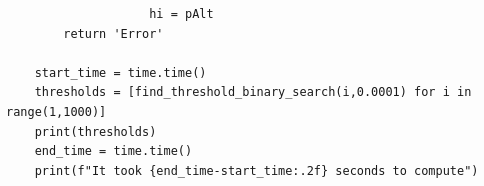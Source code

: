 \documentclass[a4paper,11pt]{article}
\theoremstyle{definition}
\begin{document}
\begin{verbatim}
					hi = pAlt
		return 'Error'
	
	start_time = time.time()
	thresholds = [find_threshold_binary_search(i,0.0001) for i in range(1,1000)]
	print(thresholds)
	end_time = time.time()
	print(f"It took {end_time-start_time:.2f} seconds to compute")
	
\end{verbatim}
\end{document}

